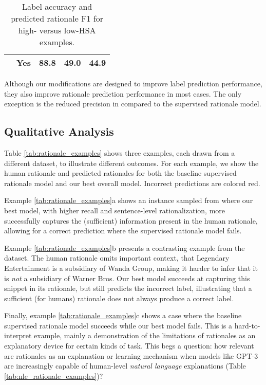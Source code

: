 \begin{table}[]
\begin{tabular}{rlrrr}
                                                      & \textbf{Yes}                                                                  & 88.8                                               & 49.0            & 44.9           \\ \hline
\end{tabular}
\caption{Label accuracy and predicted rationale F1 for high- versus low-HSA examples.}
\label{tab:selective_supervision}
\end{table}

Although our modifications are designed to improve label prediction performance, 
they also improve rationale prediction performance in most cases. The only exception is the reduced precision in \esnli compared to the supervised rationale model. 





\subsection{Qualitative Analysis}


Table \ref{tab:rationale_examples} shows three examples, each drawn from a different dataset, to illustrate different outcomes. For each example, we show the human rationale and predicted rationales for both the baseline supervised rationale model and our best overall model. Incorrect predictions are colored red.  

Example \ref{tab:rationale_examples}a shows an instance sampled from \multirc where our best model, with higher recall and sentence-level rationalization, more successfully captures the (sufficient) information present in the human rationale, allowing for a correct prediction where the supervised rationale model fails. 

Example \ref{tab:rationale_examples}b presents a contrasting example from the \fever dataset. The human rationale omits important context, that Legendary Entertainment is a subsidiary of Wanda Group, making it harder to infer that it is \textit{not} a subsidiary of Warner Bros. Our best model succeeds at capturing this snippet in its rationale, but still predicts the incorrect label, illustrating that  
a sufficient (for humans) rationale does not always produce a correct label.


Finally, example \ref{tab:rationale_examples}c shows a case where the baseline supervised rationale model succeeds while our best model fails. This is a hard-to-interpret example, mainly a demonstration of the limitations of rationales as an explanatory device for certain kinds of task. This begs a question: how relevant are rationales as an explanation or learning mechanism when models like GPT-3 \cite{brown_language_2020} are increasingly capable of human-level \textit{natural language} explanations (Table \ref{tab:nle_rationale_examples})?

